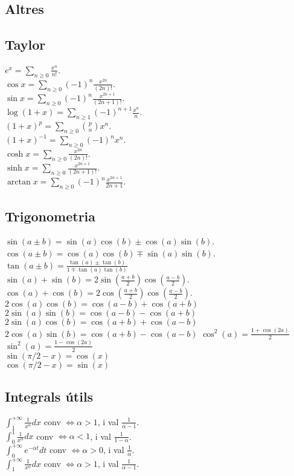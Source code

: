 \documentclass[10pt]{article}
\begin{document}
\begin{multicols}{4}
\section*{Altres}
\subsection*{Taylor}
 $e^x = \sum_{n\geq 0} \frac{x^n}{n!}$. \\
 $\cos x = \sum_{n\geq 0} (-1)^n \frac{x^{2n}}{(2n)!}$. \\
 $\sin x = \sum_{n\geq 0} (-1)^n \frac{x^{2n+1}}{(2n+1)!}$. \\
 $\log (1+x) = \sum_{n\geq 1} (-1)^{n+1} \frac{x^n}{n}$. \\
 $(1+x)^p = \sum_{n\geq 0} \binom{p}{n} x^n$. \\
 $(1+x)^{-1} = \sum_{n\geq 0} (-1)^n x^n$. \\
 $\cosh x = \sum_{n\geq 0} \frac{x^{2n}}{(2n)!}$. \\
 $\sinh x = \sum_{n\geq 0} \frac{x^{2n+1}}{(2n+1)!}$. \\ 
 $\arctan x = \sum_{n\geq 0} (-1)^n \frac{x^{2n+1}}{2n+1}$. \\ 

\subsection*{Trigonometria}
 $\sin(a \pm b) = \sin(a)\cos(b) \pm \cos(a)\sin(b)$. \\
 $\cos(a \pm b) = \cos(a)\cos(b) \mp \sin(a)\sin(b)$. \\
 $\tan(a \pm b) = \frac{\tan(a) \pm \tan(b)}{1 \mp \tan(a)\tan(b)}$
 $\sin(a) + \sin(b) = 2\sin(\frac{a+b}{2})\cos(\frac{a-b}{2})$. \\
 $\cos(a) + \cos(b) = 2\cos(\frac{a+b}{2})\cos(\frac{a-b}{2})$.
 $2\cos(a)\cos(b) = \cos(a - b) + \cos(a + b)$
 $2\sin(a)\sin(b) = \cos(a - b) - \cos(a + b)$
 $2\sin(a)\cos(b) = \cos(a + b) + \cos(a - b)$
 $2\cos(a)\sin(b) = \cos(a + b) - \cos(a - b)$
 $\cos^2(a) = \frac{1 + \cos(2a)}{2}$ \\
 $\sin^2(a) = \frac{1 - \cos(2a)}{2}$\\
 $\sin(\pi/2 - x) = \cos(x) $\\
 $\cos(\pi/2 - x) = \sin(x) $\\

\subsection*{Integrals útils}
 $\int_1^{+\infty}\frac{1}{x^\alpha}dx$ conv $\iff\alpha>1$, i val $\frac{1}{\alpha-1}$. \\
 $\int_0^1\frac{1}{x^\alpha}dx$ conv $\iff\alpha<1$, i val $\frac{1}{1-\alpha}$. \\
 $\int_0^{+\infty}e^{-\alpha t}dt$ conv $\iff\alpha>0$, i val $\frac{1}{\alpha}$. \\
 $\int_1^{+\infty}\frac{1}{x^\alpha}dx$ conv $\iff\alpha>1$, i val $\frac{1}{\alpha-1}$. \\


\end{multicols}
\end{document}
